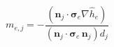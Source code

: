 $$
m_{e,j} = - \frac{\left(\mathbf n_j\cdot \boldsymbol\sigma_e\nabla\hat h_e\right)}{\left(\mathbf n_j\cdot \boldsymbol\sigma_e\,\mathbf n_j\right) d_j}
$$
